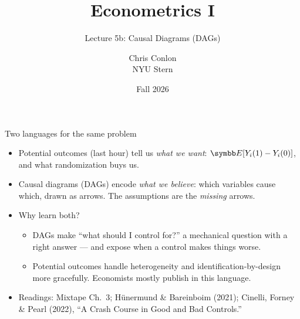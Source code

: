 \documentclass[aspectratio=169,11pt]{beamer}
\title[Causal Diagrams]{ Econometrics I}
\subtitle{Lecture 5b: Causal Diagrams (DAGs)}
\author{Chris Conlon \\NYU Stern}
\date{Fall 2026}
\begin{document}
\maketitle


\begin{frame}{Two languages for the same problem}
\begin{itemize}
	\item \alert{Potential outcomes} (last hour) tell us \emph{what we want}:
	$\E[Y_i(1) - Y_i(0)]$, and what randomization buys us.

	\medskip
	\item \alert{Causal diagrams} (DAGs) encode \emph{what we believe}: which variables
	cause which, drawn as arrows. The assumptions are the \emph{missing} arrows.

	\medskip
	\item Why learn both?
	\begin{itemize}
		\item DAGs make ``what should I control for?'' a mechanical question with a
		right answer --- and expose when a control makes things \alert{worse}.
		\item Potential outcomes handle heterogeneity and identification-by-design
		more gracefully. Economists mostly publish in this language.
	\end{itemize}

	\medskip
	\item Readings: Mixtape Ch.~3; H\"unermund \& Bareinboim (2021); Cinelli, Forney \&
	Pearl (2022), ``A Crash Course in Good and Bad Controls.''
\end{itemize}
\end{frame}
\end{document}
